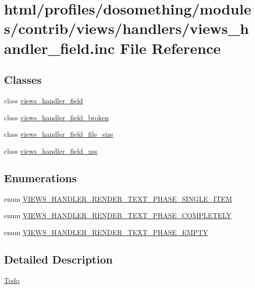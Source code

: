 \hypertarget{views__handler__field_8inc}{
\section{html/profiles/dosomething/modules/contrib/views/handlers/views\_\-handler\_\-field.inc File Reference}
\label{views__handler__field_8inc}
}
\subsection*{Classes}
\begin{DoxyCompactItemize}
\item 
class \hyperlink{classviews__handler__field}{views\_\-handler\_\-field}
\item 
class \hyperlink{classviews__handler__field__broken}{views\_\-handler\_\-field\_\-broken}
\item 
class \hyperlink{classviews__handler__field__file__size}{views\_\-handler\_\-field\_\-file\_\-size}
\item 
class \hyperlink{classviews__handler__field__xss}{views\_\-handler\_\-field\_\-xss}
\end{DoxyCompactItemize}
\subsection*{Enumerations}
\begin{DoxyCompactItemize}
\item 
enum \hyperlink{group__views__field__handlers_gaa1014f79648c5c78750110efa0437397}{VIEWS\_\-HANDLER\_\-RENDER\_\-TEXT\_\-PHASE\_\-SINGLE\_\-ITEM} 
\item 
enum \hyperlink{group__views__field__handlers_ga9e79d8dea50ce8dff131afa22ecfac41}{VIEWS\_\-HANDLER\_\-RENDER\_\-TEXT\_\-PHASE\_\-COMPLETELY} 
\item 
enum \hyperlink{group__views__field__handlers_ga0a388e031abd2ce00c90925a940235c9}{VIEWS\_\-HANDLER\_\-RENDER\_\-TEXT\_\-PHASE\_\-EMPTY} 
\end{DoxyCompactItemize}


\subsection{Detailed Description}
\begin{Desc}
\item[\hyperlink{todo__todo000073}{Todo}]\end{Desc}
